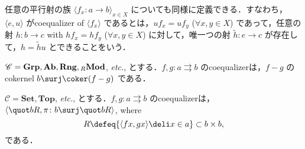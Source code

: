 \documentclass{naughieLuatex}
\newcommand\cat\mathscr
\newcommand\opair[2]{\langle #1, #2 \rangle}
\newcommand\ext\tilde
\newcommand\genby[1]{\langle #1 \rangle}
\newcommand\fmly\genby
\newcommand\etcetra{\emph{etc.}}
\newcommand\catb\mathbf
\newcommand\Set{\catb{Set}}
\newcommand\Grp{\catb{Grp}}
\newcommand\Mod{\catb{Mod}}
\newcommand\lMod[1][R]{\vphantom{\Mod}_{#1} \Mod}
\newcommand\Tops{\catb{Top}}
\newcommand\Ab{\catb{Ab}}
\newcommand\Rng{\catb{Rng}}
\begin{document}
任意の平行射の族 $\fmly{f_x \colon a \to b}_{x \in X}$ についても同様に定義できる．すなわち，$\opair e u$ がcoequalizer of $\fmly{f_x}$ であるとは，$u f_x = u f_y$ ($\forall x, y \in X$) であって，任意の射 $h \colon b \to c$ with $h f_x = h f_y$ ($\forall x, y \in X$) に対して，唯一つの射 $\ext h \colon e \to c$ が存在して，$h = \ext h u$ とできることをいう．

\begin{exs}
\item $\cat C = \Grp, \Ab, \Rng, \lMod$, \etcetra, とする．$f, g \colon a \rightrightarrows b$ のcoequalizerは，$f - g$ のcokernel $b \surj \coker (f - g)$ である．
\item $\cat C = \Set, \Tops$, \etcetra, とする．$f, g \colon a \rightrightarrows b$ のcoequalizerは，$\opair{\quot b R}{\pi \colon b \surj \quot b R}$, where
  \[
    R \defeq \{ \opair{f x}{g x} \deli x \in a \} \subset b \times b,
  \]
  である．
\end{exs}
\end{document}
